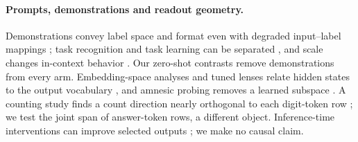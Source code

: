 \paragraph{Prompts, demonstrations and readout geometry.}
Demonstrations convey label space and format even with degraded input--label mappings
\citep{min2022rethinking}; task recognition and task learning can be separated
\citep{pan2023what}, and scale changes in-context behavior \citep{wei2023larger}. Our zero-shot
contrasts remove demonstrations from every arm. Embedding-space analyses and tuned lenses relate
hidden states to the output vocabulary \citep{dar2023embedding,belrose2023tunedlens}, and amnesic
probing removes a learned subspace \citep{elazar2021amnesic}. A counting study finds a count
direction nearly orthogonal to each digit-token row \citep{garcia2026direction}; we test the joint
span of answer-token rows, a different object. Inference-time interventions can improve selected
outputs \citep{iti}; we make no causal claim.
